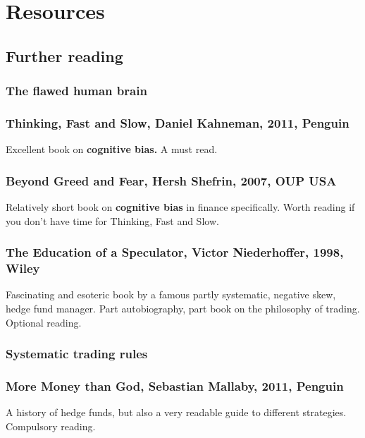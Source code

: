 \chapter{Resources}

\section*{Further reading}  {}

\subsection*{The flawed human brain}

\subsection*{Thinking, Fast and Slow, Daniel Kahneman, 2011, Penguin}

Excellent book on \textbf{cognitive bias.} A must read.

\subsection*{Beyond Greed and Fear, Hersh Shefrin, 2007, OUP USA}

Relatively short book on \textbf{cognitive bias} in finance specifically. Worth reading if you don't have time for Thinking, Fast and Slow.

\subsection*{The Education of a Speculator, Victor Niederhoffer, 1998, Wiley}

Fascinating and esoteric book by a famous partly systematic, negative skew, hedge fund manager. Part autobiography, part book on the philosophy of trading. Optional reading.

\subsection*{Systematic trading rules}

\subsection*{More Money than God, Sebastian Mallaby, 2011, Penguin}

A history of hedge funds, but also a very readable guide to different strategies. Compulsory reading.

